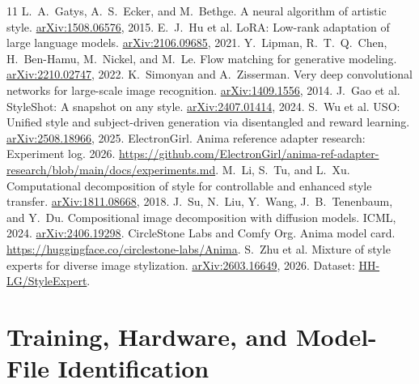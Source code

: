 \documentclass[10pt,letterpaper]{article}
\begin{document}
\begin{thebibliography}{11}
 L.~A.~Gatys, A.~S.~Ecker, and M.~Bethge. A neural algorithm of artistic style. \href{https://arxiv.org/abs/1508.06576}{arXiv:1508.06576}, 2015.
 E.~J.~Hu et al. LoRA: Low-rank adaptation of large language models. \href{https://arxiv.org/abs/2106.09685}{arXiv:2106.09685}, 2021.
 Y.~Lipman, R.~T.~Q.~Chen, H.~Ben-Hamu, M.~Nickel, and M.~Le. Flow matching for generative modeling. \href{https://arxiv.org/abs/2210.02747}{arXiv:2210.02747}, 2022.
 K.~Simonyan and A.~Zisserman. Very deep convolutional networks for large-scale image recognition. \href{https://arxiv.org/abs/1409.1556}{arXiv:1409.1556}, 2014.
 J.~Gao et al. StyleShot: A snapshot on any style. \href{https://arxiv.org/abs/2407.01414}{arXiv:2407.01414}, 2024.
 S.~Wu et al. USO: Unified style and subject-driven generation via disentangled and reward learning. \href{https://arxiv.org/abs/2508.18966}{arXiv:2508.18966}, 2025.
 ElectronGirl. Anima reference adapter research: Experiment log. 2026. \url{https://github.com/ElectronGirl/anima-ref-adapter-research/blob/main/docs/experiments.md}.
 M.~Li, S.~Tu, and L.~Xu. Computational decomposition of style for controllable and enhanced style transfer. \href{https://arxiv.org/abs/1811.08668}{arXiv:1811.08668}, 2018.
 J.~Su, N.~Liu, Y.~Wang, J.~B.~Tenenbaum, and Y.~Du. Compositional image decomposition with diffusion models. ICML, 2024. \href{https://arxiv.org/abs/2406.19298}{arXiv:2406.19298}.
 CircleStone Labs and Comfy Org. Anima model card. \url{https://huggingface.co/circlestone-labs/Anima}.
 S.~Zhu et al. Mixture of style experts for diverse image stylization. \href{https://arxiv.org/abs/2603.16649}{arXiv:2603.16649}, 2026. Dataset: \href{https://huggingface.co/datasets/HH-LG/StyleExpert}{HH-LG/StyleExpert}.
\end{thebibliography}

\appendix
\section{Training, Hardware, and Model-File Identification}
\end{document}
